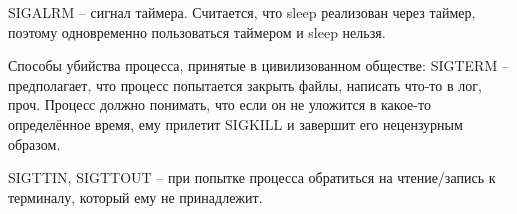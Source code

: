 \documentclass[a4paper,10pt]{article}
\begin{document}
SIGALRM -- сигнал таймера. Считается, что sleep реализован через таймер, поэтому одновременно пользоваться таймером и sleep нельзя.

Способы убийства процесса, принятые в цивилизованном обществе:
SIGTERM -- предполагает, что процесс попытается закрыть файлы, написать что-то в лог, проч. Процесс должно понимать, что если он не уложится в какое-то определённое время, ему прилетит SIGKILL и завершит его нецензурным образом.

SIGTTIN, SIGTTOUT -- при попытке процесса обратиться на чтение/запись к терминалу, который ему не принадлежит.
\end{document}
